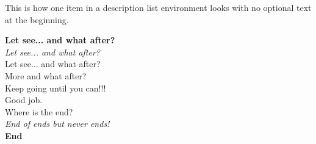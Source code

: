 \documentclass{article}
\begin{document}

\begin{description}
\item \textsf{This is how one item in a description list environment looks with no optional text at the beginning.\\}
\end{description}

\begin{center}
	\bigskip
	\textbf{Let see... and what after?}
	\bigskip
	\\
	\textit{Let see... and what after?}
	\bigskip
	\\
	\textsf{Let see... and what after?\\
		More and what after? \\
		Keep going until you can!!! \\
		Good job.\\
		Where is the end?}
	\bigskip
	\\
	\textit{End of ends but never ends!\\}
	\bigskip
	\textbf{End}
\end{center}
\end{document}
